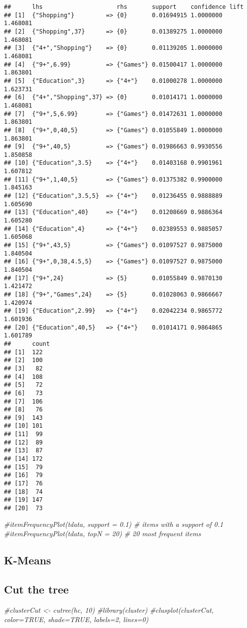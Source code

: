 \documentclass[]{article}
\newenvironment{Shaded}{\begin{snugshade}}{\end{snugshade}}
\newcommand{\CommentTok}[1]{\textcolor[rgb]{0.56,0.35,0.01}{\textit{#1}}}
\begin{document}
\begin{verbatim}
##      lhs                     rhs       support    confidence lift    
## [1]  {"Shopping"}         => {0}       0.01694915 1.0000000  1.468081
## [2]  {"Shopping",37}      => {0}       0.01389275 1.0000000  1.468081
## [3]  {"4+","Shopping"}    => {0}       0.01139205 1.0000000  1.468081
## [4]  {"9+",6.99}          => {"Games"} 0.01500417 1.0000000  1.863801
## [5]  {"Education",3}      => {"4+"}    0.01000278 1.0000000  1.623731
## [6]  {"4+","Shopping",37} => {0}       0.01014171 1.0000000  1.468081
## [7]  {"9+",5,6.99}        => {"Games"} 0.01472631 1.0000000  1.863801
## [8]  {"9+",0,40,5}        => {"Games"} 0.01055849 1.0000000  1.863801
## [9]  {"9+",40,5}          => {"Games"} 0.01986663 0.9930556  1.850858
## [10] {"Education",3.5}    => {"4+"}    0.01403168 0.9901961  1.607812
## [11] {"9+",1,40,5}        => {"Games"} 0.01375382 0.9900000  1.845163
## [12] {"Education",3.5,5}  => {"4+"}    0.01236455 0.9888889  1.605690
## [13] {"Education",40}     => {"4+"}    0.01208669 0.9886364  1.605280
## [14] {"Education",4}      => {"4+"}    0.02389553 0.9885057  1.605068
## [15] {"9+",43,5}          => {"Games"} 0.01097527 0.9875000  1.840504
## [16] {"9+",0,38,4.5,5}    => {"Games"} 0.01097527 0.9875000  1.840504
## [17] {"9+",24}            => {5}       0.01055849 0.9870130  1.421472
## [18] {"9+","Games",24}    => {5}       0.01028063 0.9866667  1.420974
## [19] {"Education",2.99}   => {"4+"}    0.02042234 0.9865772  1.601936
## [20] {"Education",40,5}   => {"4+"}    0.01014171 0.9864865  1.601789
##      count
## [1]  122  
## [2]  100  
## [3]   82  
## [4]  108  
## [5]   72  
## [6]   73  
## [7]  106  
## [8]   76  
## [9]  143  
## [10] 101  
## [11]  99  
## [12]  89  
## [13]  87  
## [14] 172  
## [15]  79  
## [16]  79  
## [17]  76  
## [18]  74  
## [19] 147  
## [20]  73
\end{verbatim}

\begin{Shaded}
\begin{Highlighting}[]
\CommentTok{#itemFrequencyPlot(tdata, support = 0.1) # items with a support of 0.1}
\CommentTok{#itemFrequencyPlot(tdata, topN = 20) # 20 most frequent items}
\end{Highlighting}
\end{Shaded}

\subsection{K-Means}\label{k-means}

\subsection{Cut the tree}\label{cut-the-tree}

\begin{Shaded}
\begin{Highlighting}[]
\CommentTok{#clusterCut <- cutree(hc, 10)}
\CommentTok{#library(cluster)}
\CommentTok{#clusplot(clusterCut, color=TRUE, shade=TRUE, labels=2, lines=0)}
\end{Highlighting}
\end{Shaded}
\end{document}
